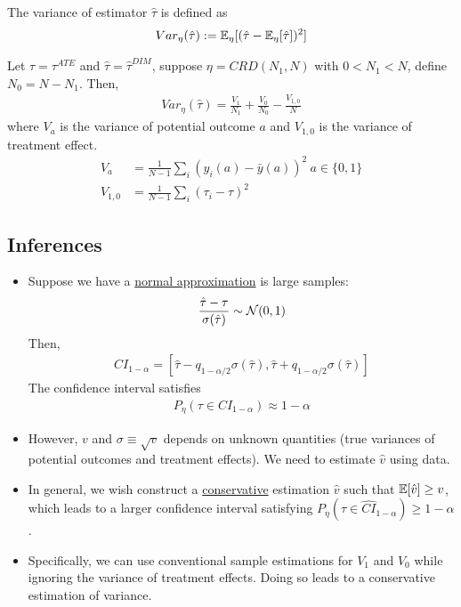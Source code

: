 \documentclass[11pt]{article}
\newcommand{\tauhat}[0]{\hat{\tau}}
\begin{document}
	\begin{definition}
		The variance of estimator $\hat{\tau}$ is defined as
		\begin{align}
			Var_\eta(\hat{\tau}) := \mathbb{E}_\eta [(\hat{\tau} - \mathbb{E}_\eta[\hat{\tau}])^2]
		\end{align}
	\end{definition}
	
	\begin{proposition}
		Let $\tau = \tau^{ATE}$ and $\hat{\tau} = \hat{\tau}^{DIM}$, suppose $\eta = CRD(N_1, N)$ with $0 < N_1 < N$, define $N_0 = N - N_1$. Then,
		\begin{align}
			Var_\eta(\hat{\tau}) = \frac{V_1}{N_1} + \frac{V_0}{N_0} - \frac{V_{1,0}}{N}
		\end{align}
		where $V_a$ is the variance of potential outcome $a$ and $V_{1,0}$ is the variance of treatment effect.
		\begin{align}
			V_{a}&=\frac{1}{N-1} \sum_i \left(y_{i}(a)-\bar{y}(a)\right)^2\ a \in \{0, 1\} \\
			V_{1,0} &= \frac{1}{N-1} \sum_{i}\left(\tau_{i}-\tau\right)^2
		\end{align}
	\end{proposition}
	
	\subsection{Inferences}
	\begin{itemize}
		\item Suppose we have a \ul{normal approximation} is large samples:
		\begin{align}
			\frac{\hat{\tau} - \tau}{\sigma(\hat{\tau})} \sim \mathcal{{N}}(0, 1)	
		\end{align}
		Then,
		\begin{align}
			CI_{1-\alpha} = [\tauhat - q_{1-\alpha/2} \sigma(\tauhat), \tauhat + q_{1-\alpha/2} \sigma(\tauhat)]
		\end{align}
		The confidence interval satisfies
		\begin{align}
			P_\eta (\tau \in CI_{1-\alpha}) \approx 1 - \alpha
		\end{align}
		\item However, $v$ and $\sigma \equiv \sqrt{v}$ depends on unknown quantities (true variances of potential outcomes and treatment effects). We need to estimate $\hat{v}$ using data.
		\item In general, we wish construct a \ul{conservative} estimation $\hat{v}$ such that $\mathbb{E}[\hat{v}] \geq v$, which leads to a larger confidence interval satisfying $P_\eta(\tau \in \hat{CI}_{1-\alpha}) \geq 1 - \alpha$.
		\item Specifically, we can use conventional sample estimations for $V_1$ and $V_0$ while ignoring the variance of treatment effects. Doing so leads to a conservative estimation of variance.
	\end{itemize}
	
\end{document}
